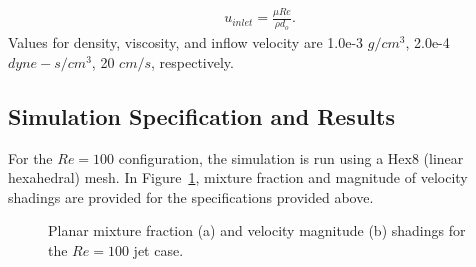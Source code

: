 \documentclass{article}
\begin{document}
\begin{align}
  u_{inlet} = \frac{\mu Re}{\rho d_o}.
\label{eq:muForm}
\end{align}
%
Values for density, viscosity, and inflow velocity are 1.0e-3 $g/cm^3$, 2.0e-4 $dyne-s/cm^3$, 
20 $cm/s$, respectively.
\subsection{Simulation Specification and Results}

For the $Re = 100$ configuration, the simulation is run using a Hex8 (linear hexahedral)
mesh. In Figure~\ref{fig:results}, mixture fraction and magnitude of velocity shadings 
are provided for the specifications provided above.

\begin{figure}[!htbp]
  \centering
  \centering
  \caption{Planar mixture fraction (a) and velocity magnitude (b) shadings for the $Re = 100$ jet case.}
  \label{fig:results}
\end{figure}
\end{document}
